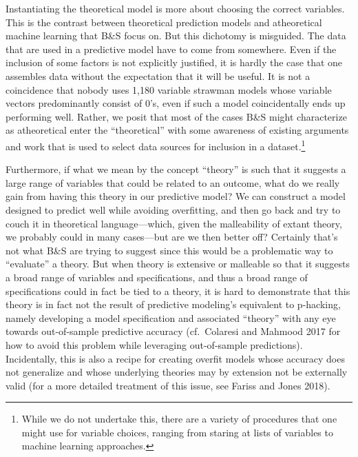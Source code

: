 \documentclass[
]{article}
\begin{document}
Instantiating the theoretical model is more about choosing the correct variables. This is the contrast between theoretical prediction models and atheoretical machine learning that B\&S focus on. But this dichotomy is misguided. The data that are used in a predictive model have to come from somewhere. Even if the inclusion of some factors is not explicitly justified, it is hardly the case that one assembles data without the expectation that it will be useful. It is not a coincidence that nobody uses 1,180 variable strawman models whose variable vectors predominantly consist of 0's, even if such a model coincidentally ends up performing well. Rather, we posit that most of the cases B\&S might characterize as atheoretical enter the ``theoretical'' with some awareness of existing arguments and work that is used to select data sources for inclusion in a dataset.\footnote{While we do not undertake this, there are a variety of procedures that one might use for variable choices, ranging from staring at lists of variables to machine learning approaches.}

Furthermore, if what we mean by the concept ``theory'' is such that it suggests a large range of variables that could be related to an outcome, what do we really gain from having this theory in our predictive model? We can construct a model designed to predict well while avoiding overfitting, and then go back and try to couch it in theoretical language---which, given the malleability of extant theory, we probably could in many cases---but are we then better off? Certainly that's not what B\&S are trying to suggest since this would be a problematic way to ``evaluate'' a theory. But when theory is extensive or malleable so that it suggests a broad range of variables and specifications, and thus a broad range of specifications could in fact be tied to a theory, it is hard to demonstrate that this theory is in fact not the result of predictive modeling's equivalent to p-hacking, namely developing a model specification and associated ``theory'' with any eye towards out-of-sample predictive accuracy (cf.~Colaresi and Mahmood 2017 for how to avoid this problem while leveraging out-of-sample predictions). Incidentally, this is also a recipe for creating overfit models whose accuracy does not generalize and whose underlying theories may by extension not be externally valid (for a more detailed treatment of this issue, see Fariss and Jones 2018).
\end{document}

